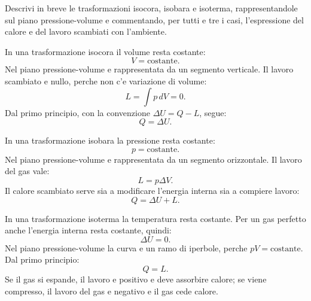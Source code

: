 
\begin{esercizio}
Descrivi in breve le trasformazioni isocora, isobara e isoterma,
rappresentandole sul piano pressione-volume e commentando, per tutti e tre i
casi, l'espressione del calore e del lavoro scambiati con l'ambiente.
\end{esercizio}

\begin{soluzione}
In una trasformazione isocora il volume resta costante:
\[
V=\text{costante}.
\]
Nel piano pressione-volume e rappresentata da un segmento verticale. Il lavoro
scambiato e nullo, perche non c'e variazione di volume:
\[
L=\int p\,dV=0.
\]
Dal primo principio, con la convenzione \(\Delta U=Q-L\), segue:
\[
Q=\Delta U.
\]

In una trasformazione isobara la pressione resta costante:
\[
p=\text{costante}.
\]
Nel piano pressione-volume e rappresentata da un segmento orizzontale. Il
lavoro del gas vale:
\[
L=p\Delta V.
\]
Il calore scambiato serve sia a modificare l'energia interna sia a compiere
lavoro:
\[
Q=\Delta U+L.
\]

In una trasformazione isoterma la temperatura resta costante. Per un gas
perfetto anche l'energia interna resta costante, quindi:
\[
\Delta U=0.
\]
Nel piano pressione-volume la curva e un ramo di iperbole, perche
\(pV=\text{costante}\). Dal primo principio:
\[
Q=L.
\]
Se il gas si espande, il lavoro e positivo e deve assorbire calore; se viene
compresso, il lavoro del gas e negativo e il gas cede calore.
\end{soluzione}
